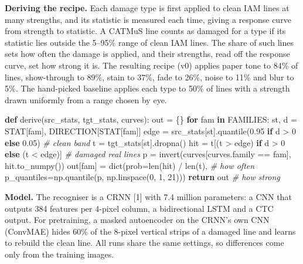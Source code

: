 \documentclass[
  12pt,
  a4paper,
]{report}
\newenvironment{Shaded}{}{}
\newcommand{\BuiltInTok}[1]{\textcolor[rgb]{0.00,0.50,0.00}{#1}}
\newcommand{\CommentTok}[1]{\textcolor[rgb]{0.38,0.63,0.69}{\textit{#1}}}
\newcommand{\ControlFlowTok}[1]{\textcolor[rgb]{0.00,0.44,0.13}{\textbf{#1}}}
\newcommand{\DecValTok}[1]{\textcolor[rgb]{0.25,0.63,0.44}{#1}}
\newcommand{\FloatTok}[1]{\textcolor[rgb]{0.25,0.63,0.44}{#1}}
\newcommand{\KeywordTok}[1]{\textcolor[rgb]{0.00,0.44,0.13}{\textbf{#1}}}
\newcommand{\NormalTok}[1]{#1}
\newcommand{\OperatorTok}[1]{\textcolor[rgb]{0.40,0.40,0.40}{#1}}
\begin{document}
\textbf{Deriving the recipe.} Each damage type is first applied to clean
IAM lines at many strengths, and its statistic is measured each time,
giving a response curve from strength to statistic. A CATMuS line counts
as damaged for a type if its statistic lies outside the 5--95\% range of
clean IAM lines. The share of such lines sets how often the damage is
applied, and their strengths, read off the response curve, set how
strong it is. The resulting recipe (v0) applies paper tone to 84\% of
lines, show-through to 89\%, stain to 37\%, fade to 26\%, noise to 11\%
and blur to 5\%. The hand-picked baseline applies each type to 50\% of
lines with a strength drawn uniformly from a range chosen by eye.

\begin{Shaded}
\begin{Highlighting}[]
\KeywordTok{def}\NormalTok{ derive(src\_stats, tgt\_stats, curves):}
\NormalTok{    out }\OperatorTok{=}\NormalTok{ \{\}}
    \ControlFlowTok{for}\NormalTok{ fam }\KeywordTok{in}\NormalTok{ FAMILIES:}
\NormalTok{        st, d }\OperatorTok{=}\NormalTok{ STAT[fam], DIRECTION[STAT[fam]]}
\NormalTok{        edge }\OperatorTok{=}\NormalTok{ src\_stats[st].quantile(}\FloatTok{0.95} \ControlFlowTok{if}\NormalTok{ d }\OperatorTok{\textgreater{}} \DecValTok{0} \ControlFlowTok{else} \FloatTok{0.05}\NormalTok{)  }\CommentTok{\# clean band}
\NormalTok{        t }\OperatorTok{=}\NormalTok{ tgt\_stats[st].dropna()}
\NormalTok{        hit }\OperatorTok{=}\NormalTok{ t[(t }\OperatorTok{\textgreater{}}\NormalTok{ edge) }\ControlFlowTok{if}\NormalTok{ d }\OperatorTok{\textgreater{}} \DecValTok{0} \ControlFlowTok{else}\NormalTok{ (t }\OperatorTok{\textless{}}\NormalTok{ edge)]  }\CommentTok{\# damaged real lines}
\NormalTok{        p }\OperatorTok{=}\NormalTok{ invert(curves[curves.family }\OperatorTok{==}\NormalTok{ fam], hit.to\_numpy())}
\NormalTok{        out[fam] }\OperatorTok{=} \BuiltInTok{dict}\NormalTok{(prob}\OperatorTok{=}\BuiltInTok{len}\NormalTok{(hit) }\OperatorTok{/} \BuiltInTok{len}\NormalTok{(t),  }\CommentTok{\# how often}
\NormalTok{                        p\_quantiles}\OperatorTok{=}\NormalTok{np.quantile(p, np.linspace(}\DecValTok{0}\NormalTok{, }\DecValTok{1}\NormalTok{, }\DecValTok{21}\NormalTok{)))}
    \ControlFlowTok{return}\NormalTok{ out                                    }\CommentTok{\# how strong}
\end{Highlighting}
\end{Shaded}

\textbf{Model.} The recogniser is a CRNN {[}1{]} with 7.4 million
parameters: a CNN that outputs 384 features per 4-pixel column, a
bidirectional LSTM and a CTC output. For pretraining, a masked
autoencoder on the CRNN's own CNN (ConvMAE) hides 60\% of the 8-pixel
vertical strips of a damaged line and learns to rebuild the clean line.
All runs share the same settings, so differences come only from the
training images.
\end{document}
